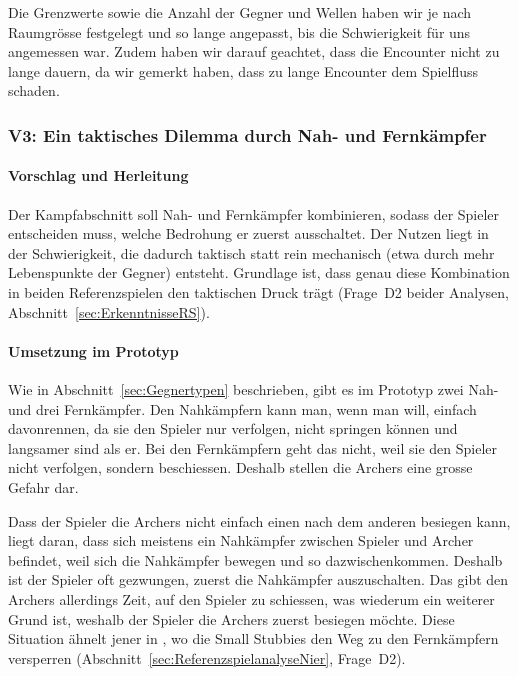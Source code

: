 \documentclass[../Main.tex]{subfiles}
\begin{document}
Die Grenzwerte sowie die Anzahl der Gegner und Wellen haben wir je nach Raumgrösse festgelegt und so lange angepasst, bis die Schwierigkeit für uns angemessen war. Zudem haben wir darauf geachtet, dass die Encounter nicht zu lange dauern, da wir gemerkt haben, dass zu lange Encounter dem Spielfluss schaden.

\subsubsection{V3: Ein taktisches Dilemma durch Nah- und Fernkämpfer} \label{sec:V3}

\paragraph{Vorschlag und Herleitung}
Der Kampfabschnitt soll Nah- und Fernkämpfer kombinieren, sodass der Spieler entscheiden muss, welche Bedrohung er zuerst ausschaltet. Der Nutzen liegt in der Schwierigkeit, die dadurch taktisch statt rein mechanisch (etwa durch mehr Lebenspunkte der Gegner) entsteht. Grundlage ist, dass genau diese Kombination in beiden Referenzspielen den taktischen Druck trägt (Frage~D2 beider Analysen, Abschnitt~\ref{sec:ErkenntnisseRS}).

\paragraph{Umsetzung im Prototyp}
Wie in Abschnitt~\ref{sec:Gegnertypen} beschrieben, gibt es im Prototyp zwei Nah- und drei Fernkämpfer. Den Nahkämpfern kann man, wenn man will, einfach davonrennen, da sie den Spieler nur verfolgen, nicht springen können und langsamer sind als er. Bei den Fernkämpfern geht das nicht, weil sie den Spieler nicht verfolgen, sondern beschiessen. Deshalb stellen die Archers eine grosse Gefahr dar.

Dass der Spieler die Archers nicht einfach einen nach dem anderen besiegen kann, liegt daran, dass sich meistens ein Nahkämpfer zwischen Spieler und Archer befindet, weil sich die Nahkämpfer bewegen und so dazwischenkommen. Deshalb ist der Spieler oft gezwungen, zuerst die Nahkämpfer auszuschalten. Das gibt den Archers allerdings Zeit, auf den Spieler zu schiessen, was wiederum ein weiterer Grund ist, weshalb der Spieler die Archers zuerst besiegen möchte. Diese Situation ähnelt jener in , wo die Small Stubbies den Weg zu den Fernkämpfern versperren (Abschnitt~\ref{sec:ReferenzspielanalyseNier}, Frage~D2).
\end{document}
